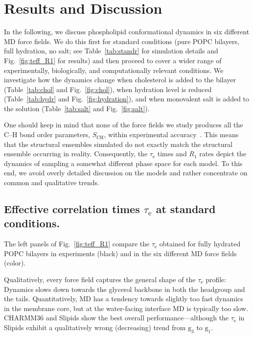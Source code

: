\documentclass[journal=jpcbfk,manuscript=article,layout=twocolumn]{achemso}
\begin{document}
\section{Results and Discussion}

In the following, we discuss phospholipid conformational  dynamics in
six different MD force fields. We do this first for %
standard conditions (pure POPC bilayers, full hydration, no salt;
see Table~\ref{tab:standr} for simulation details and Fig.~\ref{fig:teff_R1} for results)
%
and then proceed to
cover a wider range of experimentally, biologically, and computationally relevant conditions. We investigate how the dynamics change when cholesterol is added to the bilayer (Table~\ref{tab:chol} and Fig.~\ref{fig:chol}), when hydration level is reduced (Table~\ref{tab:hydr} and Fig.~\ref{fig:hydration}), and when monovalent salt is added to the solution (Table~\ref{tab:salt} and Fig.~\ref{fig:salt}).

One should keep in mind that none of the force fields we study
produces all the C--H bond order parameters, $S_\mathrm{CH}$, within experimental accuracy~\cite{botan15}.
%
%
This means that the structural ensembles simulated do not exactly match
the structural ensemble occurring in reality.%
%
Consequently, the
$\tau_\mathrm{e}$ times and $R_1$ rates
depict the dynamics of sampling a somewhat different phase space
for each model. %
%
To this end, we avoid overly detailed discussion on the models and rather concentrate on common and qualitative trends.


\subsection*{Effective correlation times $\tau_\mathrm e$ at standard conditions.}
The left panels of Fig.~\ref{fig:teff_R1} compare the $\tau_\mathrm{e}$ obtained for fully hydrated POPC bilayers in experiments (black) and in the six different MD force fields (color).

Qualitatively, every force field captures the general shape of the $\tau_\mathrm{e}$ profile: Dynamics slows down towards the glycerol backbone in both the headgroup and the tails. Quantitatively, MD has a tendency towards
slightly too fast dynamics in the membrane core,
but
at the water-facing interface MD is typically too slow.
CHARMM36 and Slipids show the best overall performance---although the $\tau_\mathrm{e}$ in Slipids exhibit a qualitatively wrong (decreasing) trend from $\mathrm g_{3}$ to $\mathrm g_{1}$.
\end{document}
